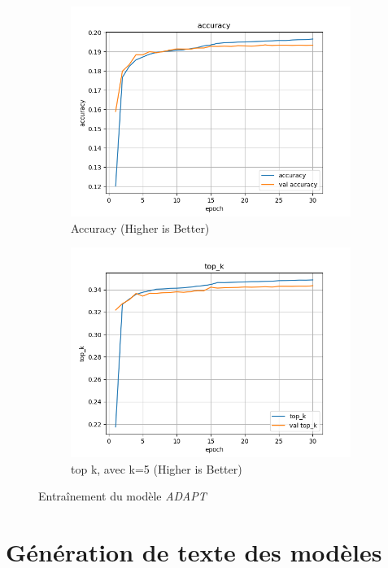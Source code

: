 \documentclass[a4paper]{article}
\begin{document}
\begin{figure}[ht]
  \begin{subfigure}{0.47\textwidth}
    \includegraphics[width=\linewidth]{../logs/learnfromword2vect_0/accuracy.png}
    \caption{Accuracy (Higher is Better)}
  \end{subfigure}
  \hfill
  \begin{subfigure}{0.47\textwidth}
    \includegraphics[width=\linewidth]{../logs/learnfromword2vect_0/top_k.png}
    \caption{top k, avec k=5 (Higher is Better)}
  \end{subfigure}
  \caption{Entraînement du modèle \textit{ADAPT}}
  \label{subfig:result model 3}
\end{figure}


\section{Génération de texte des modèles}
\end{document}
